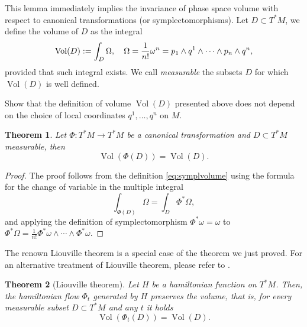 \documentclass[english,fontsize=11pt,paper=a5,oneside]{scrbook}
\let\d\relax
\newcommand{\d}{\mathrm{d}}
\DeclareMathOperator{\Vol}{Vol}
\newtheorem{theorem}{Theorem}[chapter]
\theoremstyle{definition}
\newenvironment{exercise}
  {\pushQED{\qed}\renewcommand{\qedsymbol}{$\maltese$}\exercisex}
  {\popQED\endexercisex}
\begin{document}
This lemma immediately implies the invariance of phase space volume with respect to canonical transformations (or symplectomorphisms).
Let $D\subset T^*M$, we define the volume of $D$ as the integral
\begin{equation}\label{eq:symplvolume}
  \Vol(D) :=\int_D \Omega, \quad \Omega = \frac1{n!} \omega^n = \d p_1 \wedge \d q^1 \wedge \cdots \wedge \d p_n \wedge \d q^n,
\end{equation}
provided that such integral exists.
We call \emph{measurable} the subsets $D$ for which $\Vol(D)$ is well defined.

\begin{exercise}
  Show that the definition of volume $\Vol(D)$ presented above does not depend on the choice of local coordinates $q^1, \ldots, q^n$ on $M$.
\end{exercise}

\begin{theorem}\label{thm:liouville}
  Let $\Phi:T^*M \to T^*M$ be a canonical transformation and $D\subset T^*M$ measurable, then
  \begin{equation}
    \Vol(\Phi(D)) = \Vol(D).
  \end{equation}
\end{theorem}
\begin{proof}
  The proof follows from the definition \eqref{eq:symplvolume} using the formula for the change of variable in the multiple integral
  \begin{equation}
    \int_{\Phi(D)}\Omega = \int_D \Phi^*\Omega,
  \end{equation}
  and applying the definition of symplectomorphism $\Phi^* \omega = \omega$ to $\Phi^* \Omega = \frac1{n!}\Phi^*\omega\wedge\cdots\wedge\Phi^*\omega$.
\end{proof}

The renown Liouville theorem is a special case of the theorem we just proved.
For an alternative treatment of Liouville theorem, please refer to \cite[Chapter 3.16]{book:arnold}.

\begin{theorem}[Liouville theorem]
  Let $H$ be a hamiltonian function on $T^*M$.
  Then, the hamiltonian flow $\Phi_t$ generated by $H$ preserves the volume, that is, for every measurable subset $D\subset T^*M$ and any $t$ it holds
  \begin{equation}
    \Vol(\Phi_t(D)) = \Vol(D).
  \end{equation}
\end{theorem}
\end{document}
